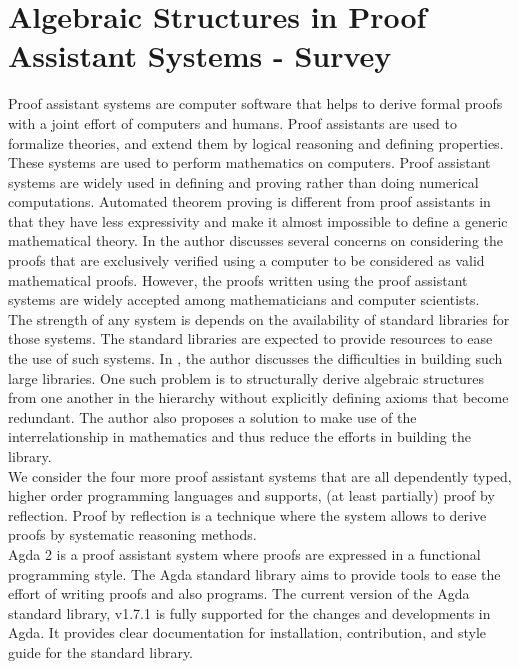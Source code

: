 \chapter{Algebraic Structures in Proof Assistant Systems - Survey}

Proof assistant systems are computer software that helps to derive formal
proofs with a joint effort of computers and humans. Proof assistants
are used to formalize theories, and extend them by logical reasoning and
defining properties\cite{2019arXiv191203028S}. These systems are used to
perform mathematics on computers. Proof assistant systems are widely used in
defining and proving rather than doing numerical computations. Automated
theorem proving is different from proof assistants in that they have less
expressivity and make it almost impossible to define a generic mathematical
theory. In \cite{CaretteBigMath} the author discusses several concerns on
considering the proofs that are exclusively verified using a computer to be
considered as valid mathematical proofs. However, the proofs written using the
proof assistant systems are widely accepted among mathematicians and computer
scientists.\\
The strength of any system is depends on the availability of standard
libraries for those systems. The standard libraries are expected to provide
resources to ease the use of such systems. In \cite{BuildingDiamond}, the author
discusses the difficulties in building such large libraries. One such problem is
to structurally derive algebraic structures from one another in the hierarchy
without explicitly defining axioms that become redundant. The author also
proposes a solution to make use of the interrelationship in mathematics and thus
reduce the efforts in building the library.\\
We consider the four more proof assistant systems that are all dependently
typed, higher order programming languages and supports, (at least partially) proof
by reflection. Proof by reflection is a technique where the system allows to
derive proofs by systematic reasoning methods.
\\
Agda 2 is a proof assistant system where proofs are expressed in a functional
programming style. The Agda standard library aims to provide tools to ease the
effort of writing proofs and also programs. The current version of the Agda
standard library, v1.7.1 is fully supported for the changes and developments in
Agda. It provides clear documentation for installation, contribution, and style
guide for the standard library.

